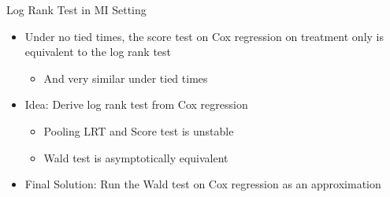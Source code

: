 \begin{frame}{Log Rank Test in MI Setting}
 \begin{itemize}
 \item Under no tied times, the score test on
  Cox regression on treatment only is equivalent to the
log rank test
\begin{itemize}
 \item And very similar under tied times
\end{itemize}
\item Idea: Derive log rank test from Cox regression
\begin{itemize}
 \item Pooling LRT and Score test is unstable \cite{Marshall2009}
 \item Wald test is asymptotically equivalent
\end{itemize}
 \item Final Solution: Run the Wald test on Cox regression as an approximation

 \end{itemize}
\end{frame}

